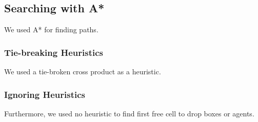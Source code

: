 \subsection{Searching with A*}

We used A* for finding paths.~\cite{pathfinding2016redblobgames}

\subsubsection{Tie-breaking Heuristics}

We used a tie-broken cross product as a heuristic.~\cite{pathfinding2016redblobgames}

\subsubsection{Ignoring Heuristics}

Furthermore, we used no heuristic to find first free cell to drop boxes or agents.
